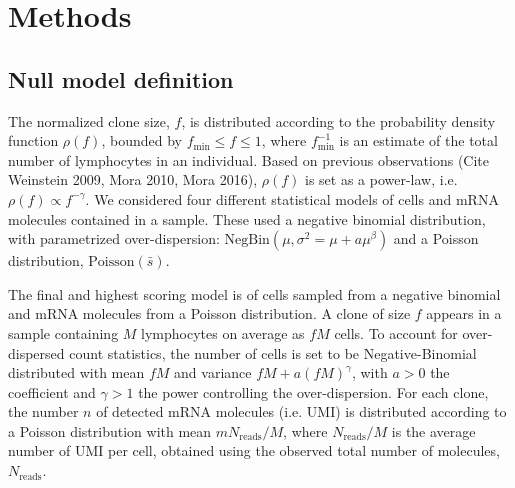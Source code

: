 \documentclass[letterpaper,english,prl,reprint,longbibliography]{revtex4-1} %
\begin{document}
\section*{Methods}

\subsection*{Null model definition}
The normalized clone size, $f$, is distributed according to the probability density function $\rho(f)$, bounded by $f_{\textrm{min}}\leq f \leq 1$, where $f_{\textrm{min}}^{-1}$ is an estimate of the total number of lymphocytes in an individual. Based on previous observations (Cite Weinstein 2009, Mora 2010, Mora 2016), $\rho(f)$ is set as a power-law, i.e. $\rho(f)\propto f^{-\gamma}$. We considered four different statistical models of cells and mRNA molecules contained in a sample. These used a negative binomial distribution, with parametrized over-dispersion: $\mathrm{NegBin}(\mu, \sigma^2=\mu+a \mu^{\beta})$ and a Poisson distribution, $\mathrm{Poisson}(\bar{s})$.

The final and highest scoring model is of cells sampled from a negative binomial and mRNA molecules from a Poisson distribution. A clone of size $f$ appears in a sample containing $M$ lymphocytes on average as $fM$ cells. To account for over-dispersed count statistics, the number of cells is set to be Negative-Binomial distributed with mean $fM$ and variance $fM+a (fM)^{\gamma}$, with $a>0$ the coefficient and $\gamma>1$ the power controlling the over-dispersion. For each clone, the number $n$ of detected mRNA molecules (i.e. UMI) is distributed according to a Poisson distribution with mean $mN_{\textrm{reads}}/M$, where $N_{\textrm{reads}}/M$ is the average number of UMI per cell, obtained using the observed total number of molecules, $N_{\textrm{reads}}$.
 
\end{document}
